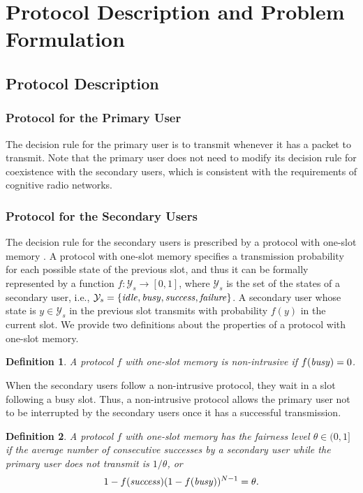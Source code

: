 \documentclass[12pt,draftclsnofoot,onecolumn]{IEEEtran}
\newtheorem{definition}{Definition}
\begin{document}
\section{Protocol Description and Problem Formulation}

\subsection{Protocol Description}

\subsubsection{Protocol for the Primary User}

The decision rule for the primary user is to transmit
whenever it has a packet to transmit. Note that the primary user
does not need to modify its decision rule for coexistence with
the secondary users, which is consistent with the requirements of
cognitive radio networks.

\subsubsection{Protocol for the Secondary Users}

The decision rule for the secondary users is prescribed by a protocol with one-slot memory \cite{park}.
A protocol with one-slot memory specifies a transmission
probability for each possible state of the previous slot, and thus it can be
formally represented by a function $f:\mathcal{Y}_{s} \rightarrow [0,1]$,
where $\mathcal{Y}_{s}$ is the set of the states of a secondary user, i.e.,
$\mathcal{Y}_{s} = \{\textrm{\emph{idle}}, \textrm{\emph{busy}}, \textrm{\emph{success}}, \textrm{\emph{failure}} \}$.
A secondary user whose state is $y \in \mathcal{Y}_{s}$ in the previous slot
transmits with probability $f(y)$ in the current slot. We provide two definitions
about the properties of a protocol with one-slot memory.

\begin{definition}
A protocol $f$ with one-slot memory is \emph{non-intrusive} if $f(\textrm{\emph{busy}}) = 0$.
\end{definition}

When the secondary users follow a non-intrusive protocol, they wait in a slot
following a busy slot.
Thus, a non-intrusive protocol allows the primary user not to be interrupted
by the secondary users once it has a successful transmission.

\begin{definition}
A protocol $f$ with one-slot memory has the \emph{fairness level} $\theta \in (0,1]$
if the average number of consecutive successes by a secondary user while the primary
user does not transmit is $1/\theta$, or
\begin{align} \label{eq:fair}
1 - f(\textrm{\emph{success}}) (1-f(\textrm{\emph{busy}}))^{N-1} = \theta.
\end{align}
\end{definition}
\end{document}
